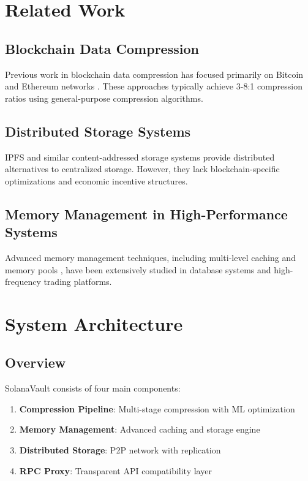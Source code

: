 \documentclass[11pt,a4paper]{article}
\begin{document}
\section{Related Work}

\subsection{Blockchain Data Compression}
Previous work in blockchain data compression has focused primarily on Bitcoin and Ethereum networks \cite{blockchain_compression_survey}. These approaches typically achieve 3-8:1 compression ratios using general-purpose compression algorithms.

\subsection{Distributed Storage Systems}
IPFS \cite{ipfs_paper} and similar content-addressed storage systems provide distributed alternatives to centralized storage. However, they lack blockchain-specific optimizations and economic incentive structures.

\subsection{Memory Management in High-Performance Systems}
Advanced memory management techniques, including multi-level caching \cite{cache_hierarchy} and memory pools \cite{memory_pools}, have been extensively studied in database systems and high-frequency trading platforms.

\section{System Architecture}

\subsection{Overview}

SolanaVault consists of four main components:

\begin{enumerate}
    \item \textbf{Compression Pipeline}: Multi-stage compression with ML optimization
    \item \textbf{Memory Management}: Advanced caching and storage engine
    \item \textbf{Distributed Storage}: P2P network with replication
    \item \textbf{RPC Proxy}: Transparent API compatibility layer
\end{enumerate}
\end{document}
